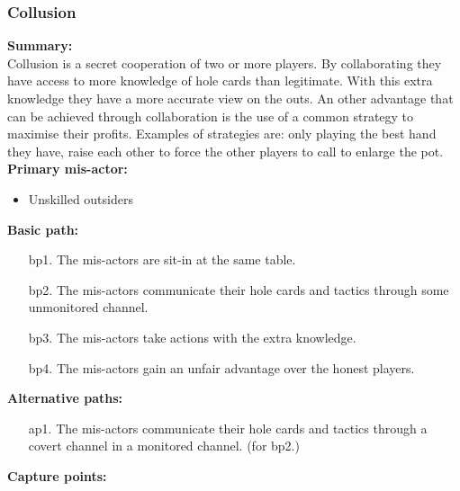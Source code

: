 \documentclass[a4paper,11pt]{report}
\begin{document}
\subsubsection{Collusion}
\textbf{Summary:} \\
Collusion is a secret cooperation of two or more players. By collaborating they have access to more knowledge of hole cards than legitimate. With this extra knowledge they have a more accurate view on the outs. An other advantage that can be achieved through collaboration is the use of a common strategy to maximise their profits. Examples of strategies are: only playing the best hand they have, raise each other to force the other players to call to enlarge the pot. \\
\textbf{Primary mis-actor:}
\begin{itemize}
\item Unskilled outsiders
\end{itemize}
\textbf{Basic path:}
\begin{enumerate}
\item[bp1.] The mis-actors are sit-in at the same table. 
\item[bp2.] The mis-actors communicate their hole cards and tactics through some unmonitored channel.
\item[bp3.] The mis-actors take actions with the extra knowledge.
\item[bp4.] The mis-actors gain an unfair advantage over the honest players.
\end{enumerate}
\textbf{Alternative paths:}
\begin{itemize}
\item[ap1.] The mis-actors communicate their hole cards and tactics through a covert channel in a monitored channel. (for bp2.)
\end{itemize}
\textbf{Capture points:}
\end{document}
